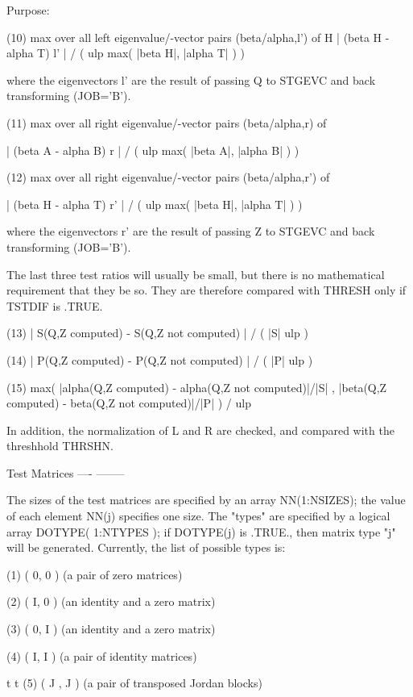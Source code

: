 \begin{DoxyParagraph}{Purpose\+: }
\begin{DoxyVerb}
 (10)  max over all left eigenvalue/-vector pairs (beta/alpha,l') of
                           H
       | (beta H - alpha T) l' | / ( ulp max( |beta H|, |alpha T| ) )

       where the eigenvectors l' are the result of passing Q to
       STGEVC and back transforming (JOB='B').

 (11)  max over all right eigenvalue/-vector pairs (beta/alpha,r) of

       | (beta A - alpha B) r | / ( ulp max( |beta A|, |alpha B| ) )

 (12)  max over all right eigenvalue/-vector pairs (beta/alpha,r') of

       | (beta H - alpha T) r' | / ( ulp max( |beta H|, |alpha T| ) )

       where the eigenvectors r' are the result of passing Z to
       STGEVC and back transforming (JOB='B').

 The last three test ratios will usually be small, but there is no
 mathematical requirement that they be so.  They are therefore
 compared with THRESH only if TSTDIF is .TRUE.

 (13)  | S(Q,Z computed) - S(Q,Z not computed) | / ( |S| ulp )

 (14)  | P(Q,Z computed) - P(Q,Z not computed) | / ( |P| ulp )

 (15)  max( |alpha(Q,Z computed) - alpha(Q,Z not computed)|/|S| ,
            |beta(Q,Z computed) - beta(Q,Z not computed)|/|P| ) / ulp

 In addition, the normalization of L and R are checked, and compared
 with the threshhold THRSHN.

 Test Matrices
 ---- --------

 The sizes of the test matrices are specified by an array
 NN(1:NSIZES); the value of each element NN(j) specifies one size.
 The "types" are specified by a logical array DOTYPE( 1:NTYPES ); if
 DOTYPE(j) is .TRUE., then matrix type "j" will be generated.
 Currently, the list of possible types is:

 (1)  ( 0, 0 )         (a pair of zero matrices)

 (2)  ( I, 0 )         (an identity and a zero matrix)

 (3)  ( 0, I )         (an identity and a zero matrix)

 (4)  ( I, I )         (a pair of identity matrices)

         t   t
 (5)  ( J , J  )       (a pair of transposed Jordan blocks)


\end{DoxyVerb}
\end{DoxyParagraph}
